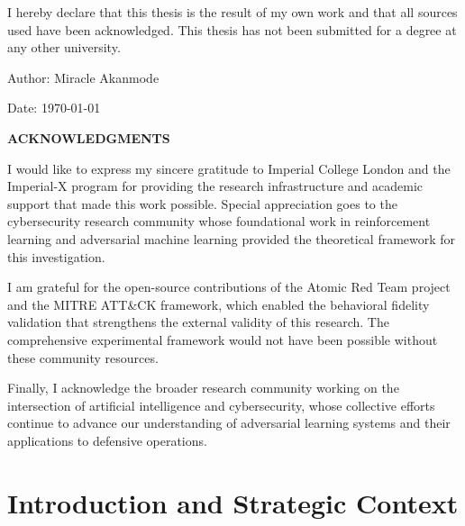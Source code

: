 \documentclass[12pt]{article}
\newcommand{\thesisauthor}{Miracle Akanmode}
\theoremstyle{definition}
\theoremstyle{plain}
\begin{document}
\vspace{1em}

I hereby declare that this thesis is the result of my own work and that all sources used have been acknowledged. This thesis has not been submitted for a degree at any other university.

\vspace{2em}

\noindent Author: \thesisauthor

\vspace{1em}

\noindent Date: \today

\clearpage

\begin{center}
\large\textbf{ACKNOWLEDGMENTS}
\end{center}

\vspace{1em}

I would like to express my sincere gratitude to Imperial College London and the Imperial-X program for providing the research infrastructure and academic support that made this work possible. Special appreciation goes to the cybersecurity research community whose foundational work in reinforcement learning and adversarial machine learning provided the theoretical framework for this investigation.

I am grateful for the open-source contributions of the Atomic Red Team project and the MITRE ATT\&CK framework, which enabled the behavioral fidelity validation that strengthens the external validity of this research. The comprehensive experimental framework would not have been possible without these community resources.

Finally, I acknowledge the broader research community working on the intersection of artificial intelligence and cybersecurity, whose collective efforts continue to advance our understanding of adversarial learning systems and their applications to defensive operations.

\clearpage

\listoffigures
\clearpage

\listoftables
\clearpage

\setcounter{page}{1}
\pagestyle{fancy}
\fancyhf{}
\fancyfoot[C]{\thepage}

\section{Introduction and Strategic Context}
\end{document}
